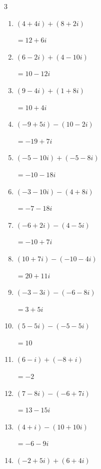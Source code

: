 \begin{multicols}{3}
\begin{enumerate}
  \item $\displaystyle (4+4i) + (8+2i)$

        $\displaystyle =12+6i$

  \item $\displaystyle (6-2i) + (4-10i)$

        $\displaystyle =10-12i$

  \item $\displaystyle (9-4i) + (1+8i)$

        $\displaystyle =10+4i$

  \item $\displaystyle (-9+5i) - (10-2i)$

        $\displaystyle =-19+7i$

  \item $\displaystyle (-5-10i) + (-5-8i)$

        $\displaystyle =-10-18i$

  \item $\displaystyle (-3-10i) - (4+8i)$

        $\displaystyle =-7-18i$

  \item $\displaystyle (-6+2i) - (4-5i)$

        $\displaystyle =-10+7i$

  \item $\displaystyle (10+7i) - (-10-4i)$

        $\displaystyle =20+11i$

  \item $\displaystyle (-3-3i) - (-6-8i)$

        $\displaystyle =3+5i$

  \item $\displaystyle (5-5i) - (-5-5i)$

        $\displaystyle =10$

  \item $\displaystyle (6-i) + (-8+i)$

        $\displaystyle =-2$

  \item $\displaystyle (7-8i) - (-6+7i)$

        $\displaystyle =13-15i$

  \item $\displaystyle (4+i) - (10+10i)$

        $\displaystyle =-6-9i$

  \item $\displaystyle (-2+5i) + (6+4i)$


\end{enumerate}
\end{multicols}
